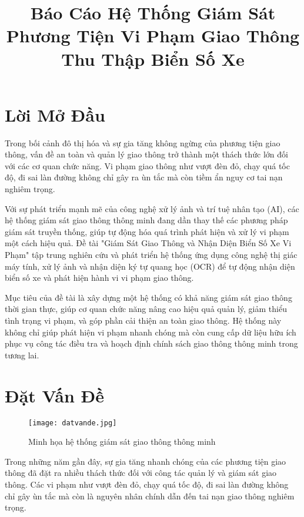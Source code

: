 \documentclass[conference]{IEEEtran}
\begin{document}


\title{Báo Cáo Hệ Thống Giám Sát Phương Tiện Vi Phạm Giao Thông Thu Thập Biển Số Xe}
\author{
}

\maketitle

\section{Lời Mở Đầu}
Trong bối cảnh đô thị hóa và sự gia tăng không ngừng của phương tiện giao thông, vấn đề an toàn và quản lý giao thông trở thành một thách thức lớn đối với các cơ quan chức năng. Vi phạm giao thông như vượt đèn đỏ, chạy quá tốc độ, đi sai làn đường không chỉ gây ra ùn tắc mà còn tiềm ẩn nguy cơ tai nạn nghiêm trọng.

Với sự phát triển mạnh mẽ của công nghệ xử lý ảnh và trí tuệ nhân tạo (AI), các hệ thống giám sát giao thông thông minh đang dần thay thế các phương pháp giám sát truyền thống, giúp tự động hóa quá trình phát hiện và xử lý vi phạm một cách hiệu quả. Đề tài "Giám Sát Giao Thông và Nhận Diện Biển Số Xe Vi Phạm" tập trung nghiên cứu và phát triển hệ thống ứng dụng công nghệ thị giác máy tính, xử lý ảnh và nhận diện ký tự quang học (OCR) để tự động nhận diện biển số xe và phát hiện hành vi vi phạm giao thông.

Mục tiêu của đề tài là xây dựng một hệ thống có khả năng giám sát giao thông thời gian thực, giúp cơ quan chức năng nâng cao hiệu quả quản lý, giảm thiểu tình trạng vi phạm, và góp phần cải thiện an toàn giao thông. Hệ thống này không chỉ giúp phát hiện vi phạm nhanh chóng mà còn cung cấp dữ liệu hữu ích phục vụ công tác điều tra và hoạch định chính sách giao thông thông minh trong tương lai.

\section{Đặt Vấn Đề}
\begin{figure}[H]
    \centering
    \texttt{[image: datvande.jpg]} %
    \caption{Minh họa hệ thống giám sát giao thông thông minh}
    \label{fig:traffic_monitoring}
\end{figure}
Trong những năm gần đây, sự gia tăng nhanh chóng của các phương tiện giao thông đã đặt ra nhiều thách thức đối với công tác quản lý và giám sát giao thông. Các vi phạm như vượt đèn đỏ, chạy quá tốc độ, đi sai làn đường không chỉ gây ùn tắc mà còn là nguyên nhân chính dẫn đến tai nạn giao thông nghiêm trọng.
\end{document}
